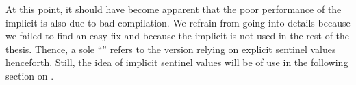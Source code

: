 At this point, it should have become apparent that the poor performance of the implicit \IS{} is also due to bad compilation.
We refrain from going into details because we failed to find an easy fix and because the implicit \IS{} is not used in the rest of the thesis.
Thence, a sole \enquote{\IS{}} refers to the version relying on explicit sentinel values henceforth.
Still, the idea of implicit sentinel values will be of use in the following section on \ShS{}.

\raggedbottom
